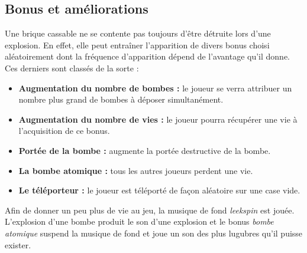 \subsection{Bonus et améliorations}
Une brique cassable ne se contente pas toujours d'être détruite lors d'une explosion. En effet, elle 
peut entraîner l'apparition de divers bonus choisi aléatoirement dont la fréquence d'apparition dépend
de l'avantage qu'il donne. Ces derniers sont classés de la sorte : 

\begin{itemize}
    \item \textbf{Augmentation du nombre de bombes :} le joueur se verra attribuer un nombre plus grand
     de bombes à déposer simultanément. 
    \item \textbf{Augmentation du nombre de vies :} le joueur pourra récupérer une vie à l'acquisition 
    de ce bonus.
    \item \textbf{Portée de la bombe :} augmente la portée destructive de la bombe.
    \item \textbf{La bombe atomique :} tous les autres joueurs perdent une vie.
    \item \textbf{Le téléporteur :} le joueur est téléporté de façon aléatoire sur une case vide.

\end{itemize}

Afin de donner un peu plus de vie au jeu, la musique de fond \textit{leekspin} est jouée. L'explosion
d'une bombe produit le son d'une explosion et le bonus \textit{bombe atomique} suspend la musique de 
fond et joue un son des plus lugubres qu'il puisse exister.


